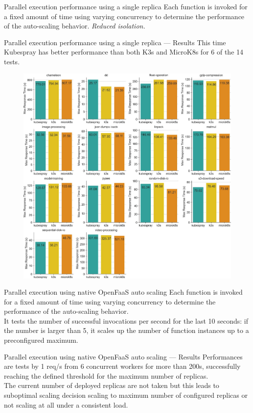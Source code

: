 \begin{frame}{Parallel execution performance using a single replica}
Each function is invoked for a fixed amount of time using varying concurrency to determine the performance of the auto-scaling behavior. \textit{Reduced isolation.}
\end{frame}


\begin{frame}{Parallel execution performance using a single replica — Results}
This time Kubespray has better performance than both K3s and MicroK8s for 6 of the 14 tests.

\begin{figure}
    \centering
    \includegraphics[width=0.5\linewidth]{static/11227_2022_4430_Fig6_HTML.jpg}
\end{figure}
\end{frame}

\begin{frame}{Parallel execution using native OpenFaaS auto scaling}
Each function is invoked for a fixed amount of time using varying concurrency to determine the performance of the auto-scaling behavior.
\pause
\\
It tests the number of successful invocations per second for the last 10 seconds: if the number is larger than 5, it scales up the number of function instances up to a preconfigured maximum.
\end{frame}


\begin{frame}{Parallel execution using native OpenFaaS auto scaling  — Results}
Performances are tests by 1 req/s from 6 concurrent workers for more than 200s, successfully reaching the defined threshold for the maximum number of replicas.\\
The current number of deployed replicas are not taken but this leads to suboptimal scaling decision scaling to maximum number of configured replicas or not scaling at all under a consistent load.
\end{frame}



